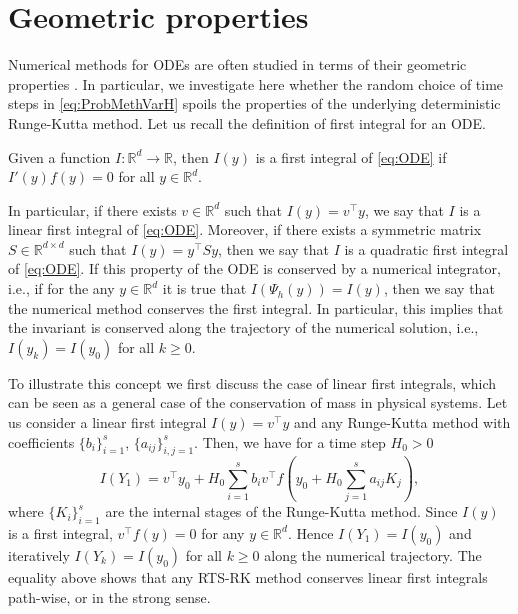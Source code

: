 \documentclass{siamart1116}
\numberwithin{theorem}{section}
\newcommand{\R}{\mathbb{R}}
\newcommand{\sksum}{{\textstyle\sum}}
\begin{document}
\section{Geometric properties}\label{sec:GeomProperties}
Numerical methods for ODEs are often studied in terms of their geometric properties \cite{HLW06}. In particular, we investigate here whether the random choice of time steps in \eqref{eq:ProbMethVarH} spoils the properties of the underlying deterministic Runge-Kutta method. Let us recall the definition of first integral for an ODE.
\begin{definition} Given a function $I\colon\R^d\to\R$, then $I(y)$ is a first integral of \eqref{eq:ODE} if $I'(y)f(y) = 0$ for all $y \in \R^d$. 
\end{definition}	
In particular, if there exists $v \in \R^d$ such that $I(y) = v^\top y$, we say that $I$ is a linear first integral of \eqref{eq:ODE}. Moreover, if there exists a symmetric matrix $S \in \R^{d\times d}$ such that $I(y) = y^\top Sy$, then we say that $I$ is a quadratic first integral of \eqref{eq:ODE}. If this property of the ODE is conserved by a numerical integrator, i.e., if for the any $y\in\R^d$ it is true that $I(\Psi_h(y)) = I(y)$, then we say that the numerical method conserves the first integral. In particular, this implies that the invariant is conserved along the trajectory of the numerical solution, i.e., $I(y_k) = I(y_0)$ for all $k\geq 0$.
	
\begin{example} To illustrate this concept we first discuss the case of linear first integrals, which can be seen as a general case of the conservation of mass in physical systems. Let us consider a linear first integral $I(y) = v^\top y$ and any Runge-Kutta method with coefficients $\{b_i\}_{i=1}^s$, $\{a_{ij}\}_{i,j=1}^s$. Then, we have for a time step $H_0 > 0$
	\begin{equation}
		I(Y_1) = v^\top y_0 + H_0 \sksum_{i=1}^s b_iv^\top f(y_0 + H_0\sksum_{j=1}^{s} a_{ij}K_j),
	\end{equation}
	where $\{K_i\}_{i=1}^s$ are the internal stages of the Runge-Kutta method. Since $I(y)$ is a first integral, $v^\top f(y) = 0$ for any $y \in \R^d$. Hence $I(Y_1)  = I(y_0)$ and iteratively $I(Y_k) = I(y_0)$ for all $k \geq 0$ along the numerical trajectory. The equality above shows that any RTS-RK method conserves linear first integrals path-wise, or in the strong sense. 
\end{example}
\end{document}
